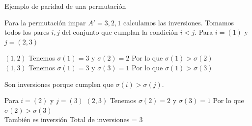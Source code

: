 \documentclass{beamer}
\begin{document}
\begin{frame}{Ejemplo de paridad de una permutación}

  Para la permutación impar $A'={3,2,1}$ calculamos las inversiones.
  \vfill
  Tomamos todos los pares $i,j$ del conjunto que cumplan la condición $i < j$.
  \vfill
  Para $i=(1)$ y $j=(2,3)$
  
  \vfill
  $(1,2)$ Tenemos $\sigma(1)=3$ y $\sigma(2)=2$ Por lo que $\sigma(1) > \sigma(2)$ \\
  $(1,3)$ Tenemos $\sigma(1)=3$ y $\sigma(3)=1$ Por lo que $\sigma(1) > \sigma(3)$
  \vfill
  
  Son inversiones porque cumplen que $\sigma(i) > \sigma(j)$.
  
  \vfill
  
  Para $i=(2)$ y $j=(3)$
  \vfill
  $(2,3)$ Tenemos $\sigma(2)=2$ y $\sigma(3)=1$ Por lo que $\sigma(2) > \sigma(3)$\\
  También es inversión
  \vfill
  Total de inversiones = 3

\end{frame}
\end{document}
